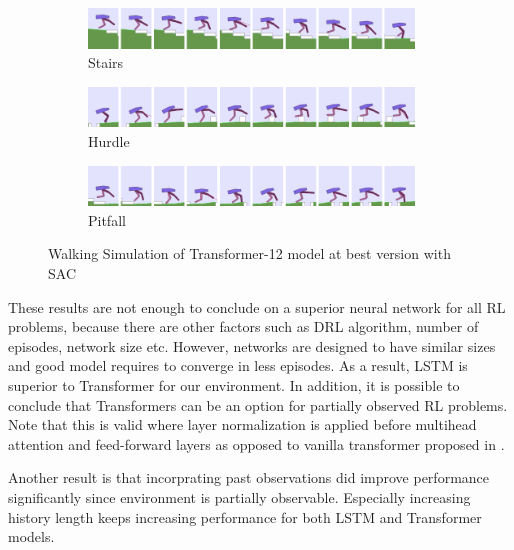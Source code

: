 \documentclass[a4paper, 12pt]{article} %
\begin{document}
\begin{figure}[!ht]
	\centering
	\begin{subfigure}{.95\textwidth}
		\centering
		\includegraphics[width=0.95\textwidth]{figures/bipedal/anim/trsf-12-stairs.png}
		\caption{Stairs}
		\label{fig:anim_trsf_stairs}
	\end{subfigure}
	\begin{subfigure}{.95\textwidth}
		\centering
		\includegraphics[width=0.95\textwidth]{figures/bipedal/anim/trsf-12-hurdle.png}
		\caption{Hurdle}
		\label{fig:anim_trsf_hurdle}
	\end{subfigure}
	\begin{subfigure}{.95\textwidth}
		\centering
		\includegraphics[width=0.95\textwidth]{figures/bipedal/anim/trsf-12-pitfall.png}
		\caption{Pitfall}
		\label{fig:anim_trsf_pitfall}
	\end{subfigure}
	\caption{Walking Simulation of Transformer-12 model at best version with SAC}
	\label{fig:trsf_simulation}
\end{figure}

These results are not enough to conclude on a superior neural network for all RL problems, because there are other factors such as DRL algorithm, number of episodes, network size etc. 
However, networks are designed to have similar sizes and good model requires to converge in less episodes. 
As a result, LSTM is superior to Transformer for our environment. 
In addition, it is possible to conclude that Transformers can be an option for partially observed RL problems.
Note that this is valid where layer normalization is applied before multihead attention and feed-forward layers \cite{xiong_layer_2020} as opposed to vanilla transformer proposed in \cite{vaswani_attention_2017}. 

Another result is that incorprating past observations did improve performance significantly since environment is partially observable.
Especially increasing history length keeps increasing performance for both LSTM and Transformer models. 
\end{document}
